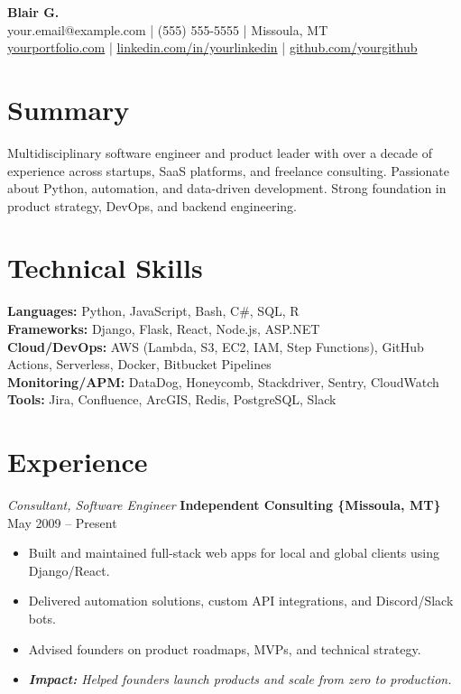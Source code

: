 \documentclass[10pt]{article}
\begin{document}
\begin{center}
    \textbf{Blair G.} \\
    your.email@example.com | (555) 555-5555 | Missoula, MT \\
    \href{https://yourportfolio.com}{yourportfolio.com} | \href{https://linkedin.com/in/yourlinkedin}{linkedin.com/in/yourlinkedin} | \href{https://github.com/yourgithub}{github.com/yourgithub}
\end{center}

\section*{Summary}
Multidisciplinary software engineer and product leader with over a decade of experience across startups, SaaS platforms, and freelance consulting. Passionate about Python, automation, and data-driven development. Strong foundation in product strategy, DevOps, and backend engineering.

\section*{Technical Skills}
\textbf{Languages:} Python, JavaScript, Bash, C\#, SQL, R \\
\textbf{Frameworks:} Django, Flask, React, Node.js, ASP.NET \\
\textbf{Cloud/DevOps:} AWS (Lambda, S3, EC2, IAM, Step Functions), GitHub Actions, Serverless, Docker, Bitbucket Pipelines \\
\textbf{Monitoring/APM:} DataDog, Honeycomb, Stackdriver, Sentry, CloudWatch \\
\textbf{Tools:} Jira, Confluence, ArcGIS, Redis, PostgreSQL, Slack

\section*{Experience}

\textit{Consultant, Software Engineer} \textbf{Independent Consulting \{Missoula, MT\}} \hfill May 2009 -- Present
\begin{itemize}
  \item Built and maintained full-stack web apps for local and global clients using Django/React.
  \item Delivered automation solutions, custom API integrations, and Discord/Slack bots.
  \item Advised founders on product roadmaps, MVPs, and technical strategy.
  \item \textit{\textbf{Impact:} Helped founders launch products and scale from zero to production.}
\end{itemize}
\end{document}
